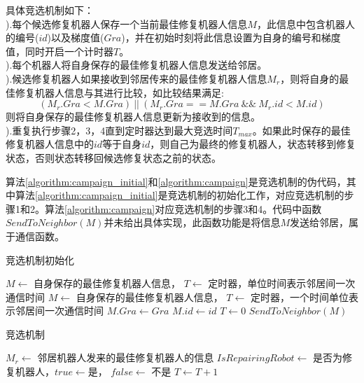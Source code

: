 具体竞选机制如下：\\
).每个候选修复机器人保存一个当前最佳修复机器人信息$M$，此信息中包含机器人的编号($id$)以及梯度值($Gra$)，并在初始时刻将此信息设置为自身的编号和梯度值，同时开启一个计时器$T$。\\
).每个机器人将自身保存的最佳修复机器人信息发送给邻居。\\
).候选修复机器人如果接收到邻居传来的最佳修复机器人信息$M_r$，则将自身的最佳修复机器人信息与其进行比较，如比较结果满足:\\
\[
	(M_r.Gra < M.Gra)\ ||\ (M_r.Gra == M.Gra\ \&\& \  M_r.id < M.id) 
\]
则将自身保存的最佳修复机器人信息更新为接收到的信息。\\
).重复执行步骤2，3，4直到定时器达到最大竞选时间$T_{max}$。如果此时保存的最佳修复机器人信息中的$id$等于自身$id$，则自己为最终的修复机器人，状态转移到修复状态，否则状态转移回候选修复状态之前的状态。

算法\ref{algorithm:campaign_initial}和\ref{algorithm:campaign}是竞选机制的伪代码，其中算法\ref{algorithm:campaign_initial}是竞选机制的初始化工作，对应竞选机制的步骤1和2。算法\ref{algorithm:campaign}对应竞选机制的步骤3和4。代码中函数$SendToNeighbor(M)$并未给出具体实现，此函数功能是将信息$M$发送给邻居，属于通信函数。
\begin{algorithm}
	\caption{竞选机制初始化}
	\label{algorithm:campaign_initial}
	\begin{algorithmic}[1]
		\Require $M \leftarrow$ 自身保存的最佳修复机器人信息， $T \leftarrow$ 定时器，单位时间表示邻居间一次通信时间
		\Ensure $M \leftarrow$ 自身保存的最佳修复机器人信息， $T \leftarrow$ 定时器，一个时间单位表示邻居间一次通信时间
			\State $M.Gra \gets Gra$
			\State $M.id \gets id$
			\State $T \gets 0$
			\State $SendToNeighbor(M)$
			\State {}
		\EndFunction
	\end{algorithmic}	
\end{algorithm}

\begin{algorithm}
	\caption{竞选机制}
	\label{algorithm:campaign}
	\begin{algorithmic}[1]
		\Require $M_r \leftarrow$ 邻居机器人发来的最佳修复机器人的信息
		\Ensure $IsRepairingRobot \leftarrow$ 是否为修复机器人，$true \leftarrow $是， $ false \leftarrow$ 不是
			\State $T \gets T+1$					
	\end{algorithmic}
\end{algorithm}

